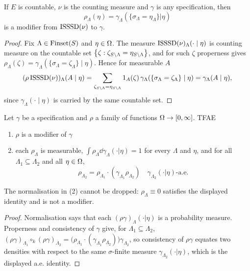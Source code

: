 \begin{lemma}
    \label{lem:exists-modif-isssd}

    If $E$ is countable, $\nu$ is the counting measure and $\gamma$ is any specification, then
    $$\rho_\Lambda(\eta) = \gamma_\Lambda(\{\sigma_\Lambda = \eta_\Lambda\} | \eta)$$
    is a modifier from $\operatorname{ISSSD}(\nu)$ to $\gamma$.
\end{lemma}
\begin{proof}

    Fix $\Lambda \in \operatorname{Finset}(S)$ and $\eta \in \Omega$. The measure $\operatorname{ISSSD}(\nu)_\Lambda(\cdot\mid\eta)$
    is counting measure on the countable set $\left\{ \zeta : \zeta_{S \setminus \Lambda} = \eta_{S\setminus\Lambda} \right\}$,
    and for such $\zeta$ properness gives
    $\rho_\Lambda(\zeta) = \gamma_\Lambda(\{\sigma_\Lambda = \zeta_\Lambda\} \mid \eta)$. Hence
    for measurable $A$
    \[(\rho\operatorname{ISSSD}(\nu))_\Lambda(A\mid\eta)
      = \sum_{\zeta_{S\setminus\Lambda} = \eta_{S\setminus\Lambda}} 1_A(\zeta)\,
        \gamma_\Lambda(\{\sigma_\Lambda = \zeta_\Lambda\} \mid \eta)
      = \gamma_\Lambda(A\mid\eta),\]
    since $\gamma_\Lambda(\cdot\mid\eta)$ is carried by the same countable set.
\end{proof}

\begin{proposition}
    \label{prop:modif-char}
    \leanok{}

    Let $\gamma$ be a specification and $\rho$ a family of functions $\Omega \to [0,\infty]$. TFAE
    \begin{enumerate}
        \item $\rho$ is a modifier of $\gamma$
        \item each $\rho_\Lambda$ is measurable, $\int \rho_\Lambda \dd\gamma_\Lambda(\cdot|\eta) = 1$
        for every $\Lambda$ and $\eta$, and for all
        $\Lambda_1 \subseteq \Lambda_2$ and all $\eta \in \Omega$,
        \[\rho_{\Lambda_2} = \rho_{\Lambda_1}\cdot (\gamma_{\Lambda_1} \rho_{\Lambda_2}) \quad \gamma_{\Lambda_2}(\cdot|\eta)\text{-a.e.}\]
    \end{enumerate}
    The normalisation in (2) cannot be dropped: $\rho_\Lambda \equiv 0$ satisfies the displayed
    identity and is not a modifier.
\end{proposition}
\begin{proof}

    Normalisation says that each $(\rho\gamma)_\Lambda(\cdot|\eta)$ is a probability measure.
    Properness and consistency of $\gamma$ give, for $\Lambda_1 \subseteq \Lambda_2$,
    $(\rho\gamma)_{\Lambda_1} \circ_k (\rho\gamma)_{\Lambda_2}
    = \big(\rho_{\Lambda_1}\cdot(\gamma_{\Lambda_1}\rho_{\Lambda_2})\big)\gamma_{\Lambda_2}$, so
    consistency of $\rho\gamma$ equates two densities with respect to the same $\sigma$-finite
    measure $\gamma_{\Lambda_2}(\cdot|\eta)$, which is the displayed a.e. identity.
\end{proof}

